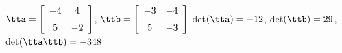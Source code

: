 {$\tta = \left[ \begin {array}{cc} -4&4\\\noalign{\medskip}5&-2\end {array}
 \right]$, 
 \quad
$\ttb = \left[ \begin {array}{cc} -3&-4\\\noalign{\medskip}5&-3\end {array}
 \right]$}
{det$(\tta)=-12$, det$(\ttb)=29$, det$(\tta\ttb)=-348$}






  

